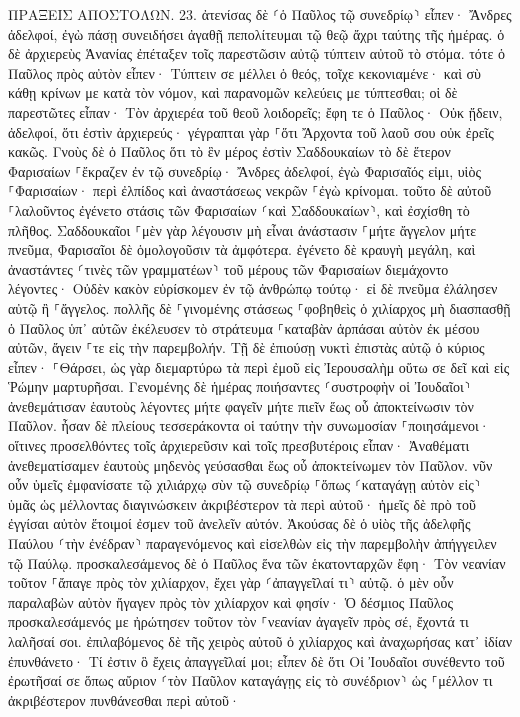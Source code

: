 \documentclass[twoside, 9pt]{extreport}
\begin{document}
ΠΡΑΞΕΙΣ ΑΠΟΣΤΟΛΩΝ.
23.
ἀτενίσας δὲ ⸂ὁ Παῦλος τῷ συνεδρίῳ⸃ εἶπεν· Ἄνδρες ἀδελφοί, ἐγὼ πάσῃ συνειδήσει ἀγαθῇ πεπολίτευμαι τῷ θεῷ ἄχρι ταύτης τῆς ἡμέρας. 
ὁ δὲ ἀρχιερεὺς Ἁνανίας ἐπέταξεν τοῖς παρεστῶσιν αὐτῷ τύπτειν αὐτοῦ τὸ στόμα. 
τότε ὁ Παῦλος πρὸς αὐτὸν εἶπεν· Τύπτειν σε μέλλει ὁ θεός, τοῖχε κεκονιαμένε· καὶ σὺ κάθῃ κρίνων με κατὰ τὸν νόμον, καὶ παρανομῶν κελεύεις με τύπτεσθαι; 
οἱ δὲ παρεστῶτες εἶπαν· Τὸν ἀρχιερέα τοῦ θεοῦ λοιδορεῖς; 
ἔφη τε ὁ Παῦλος· Οὐκ ᾔδειν, ἀδελφοί, ὅτι ἐστὶν ἀρχιερεύς· γέγραπται γὰρ ⸀ὅτι Ἄρχοντα τοῦ λαοῦ σου οὐκ ἐρεῖς κακῶς. 
Γνοὺς δὲ ὁ Παῦλος ὅτι τὸ ἓν μέρος ἐστὶν Σαδδουκαίων τὸ δὲ ἕτερον Φαρισαίων ⸀ἔκραζεν ἐν τῷ συνεδρίῳ· Ἄνδρες ἀδελφοί, ἐγὼ Φαρισαῖός εἰμι, υἱὸς ⸀Φαρισαίων· περὶ ἐλπίδος καὶ ἀναστάσεως νεκρῶν ⸀ἐγὼ κρίνομαι. 
τοῦτο δὲ αὐτοῦ ⸀λαλοῦντος ἐγένετο στάσις τῶν Φαρισαίων ⸂καὶ Σαδδουκαίων⸃, καὶ ἐσχίσθη τὸ πλῆθος. 
Σαδδουκαῖοι ⸀μὲν γὰρ λέγουσιν μὴ εἶναι ἀνάστασιν ⸀μήτε ἄγγελον μήτε πνεῦμα, Φαρισαῖοι δὲ ὁμολογοῦσιν τὰ ἀμφότερα. 
ἐγένετο δὲ κραυγὴ μεγάλη, καὶ ἀναστάντες ⸂τινὲς τῶν γραμματέων⸃ τοῦ μέρους τῶν Φαρισαίων διεμάχοντο λέγοντες· Οὐδὲν κακὸν εὑρίσκομεν ἐν τῷ ἀνθρώπῳ τούτῳ· εἰ δὲ πνεῦμα ἐλάλησεν αὐτῷ ἢ ⸀ἄγγελος. 
πολλῆς δὲ ⸀γινομένης στάσεως ⸀φοβηθεὶς ὁ χιλίαρχος μὴ διασπασθῇ ὁ Παῦλος ὑπ᾽ αὐτῶν ἐκέλευσεν τὸ στράτευμα ⸀καταβὰν ἁρπάσαι αὐτὸν ἐκ μέσου αὐτῶν, ἄγειν ⸀τε εἰς τὴν παρεμβολήν. 
Τῇ δὲ ἐπιούσῃ νυκτὶ ἐπιστὰς αὐτῷ ὁ κύριος εἶπεν· ⸀Θάρσει, ὡς γὰρ διεμαρτύρω τὰ περὶ ἐμοῦ εἰς Ἰερουσαλὴμ οὕτω σε δεῖ καὶ εἰς Ῥώμην μαρτυρῆσαι. 
Γενομένης δὲ ἡμέρας ποιήσαντες ⸂συστροφὴν οἱ Ἰουδαῖοι⸃ ἀνεθεμάτισαν ἑαυτοὺς λέγοντες μήτε φαγεῖν μήτε πιεῖν ἕως οὗ ἀποκτείνωσιν τὸν Παῦλον. 
ἦσαν δὲ πλείους τεσσεράκοντα οἱ ταύτην τὴν συνωμοσίαν ⸀ποιησάμενοι· 
οἵτινες προσελθόντες τοῖς ἀρχιερεῦσιν καὶ τοῖς πρεσβυτέροις εἶπαν· Ἀναθέματι ἀνεθεματίσαμεν ἑαυτοὺς μηδενὸς γεύσασθαι ἕως οὗ ἀποκτείνωμεν τὸν Παῦλον. 
νῦν οὖν ὑμεῖς ἐμφανίσατε τῷ χιλιάρχῳ σὺν τῷ συνεδρίῳ ⸀ὅπως ⸂καταγάγῃ αὐτὸν εἰς⸃ ὑμᾶς ὡς μέλλοντας διαγινώσκειν ἀκριβέστερον τὰ περὶ αὐτοῦ· ἡμεῖς δὲ πρὸ τοῦ ἐγγίσαι αὐτὸν ἕτοιμοί ἐσμεν τοῦ ἀνελεῖν αὐτόν. 
Ἀκούσας δὲ ὁ υἱὸς τῆς ἀδελφῆς Παύλου ⸂τὴν ἐνέδραν⸃ παραγενόμενος καὶ εἰσελθὼν εἰς τὴν παρεμβολὴν ἀπήγγειλεν τῷ Παύλῳ. 
προσκαλεσάμενος δὲ ὁ Παῦλος ἕνα τῶν ἑκατονταρχῶν ἔφη· Τὸν νεανίαν τοῦτον ⸀ἄπαγε πρὸς τὸν χιλίαρχον, ἔχει γὰρ ⸂ἀπαγγεῖλαί τι⸃ αὐτῷ. 
ὁ μὲν οὖν παραλαβὼν αὐτὸν ἤγαγεν πρὸς τὸν χιλίαρχον καὶ φησίν· Ὁ δέσμιος Παῦλος προσκαλεσάμενός με ἠρώτησεν τοῦτον τὸν ⸀νεανίαν ἀγαγεῖν πρὸς σέ, ἔχοντά τι λαλῆσαί σοι. 
ἐπιλαβόμενος δὲ τῆς χειρὸς αὐτοῦ ὁ χιλίαρχος καὶ ἀναχωρήσας κατ᾽ ἰδίαν ἐπυνθάνετο· Τί ἐστιν ὃ ἔχεις ἀπαγγεῖλαί μοι; 
εἶπεν δὲ ὅτι Οἱ Ἰουδαῖοι συνέθεντο τοῦ ἐρωτῆσαί σε ὅπως αὔριον ⸂τὸν Παῦλον καταγάγῃς εἰς τὸ συνέδριον⸃ ὡς ⸀μέλλον τι ἀκριβέστερον πυνθάνεσθαι περὶ αὐτοῦ· 
\end{document}
